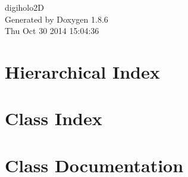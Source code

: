 \documentclass[twoside]{book}
\newcommand{\clearemptydoublepage}{%
  \newpage{\pagestyle{empty}\cleardoublepage}%
}
\begin{document}
\hypersetup{pageanchor=false}
\begin{titlepage}
\vspace*{7cm}
\begin{center}%
{\Large digiholo2\-D }\\
\vspace*{1cm}
{\large Generated by Doxygen 1.8.6}\\
\vspace*{0.5cm}
{\small Thu Oct 30 2014 15:04:36}\\
\end{center}
\end{titlepage}
\clearemptydoublepage
\tableofcontents
\clearemptydoublepage
{}
\hypersetup{pageanchor=true}

\chapter{Hierarchical Index}

\chapter{Class Index}

\chapter{Class Documentation}



































\newpage
{}
{}
\printindex
\end{document}
